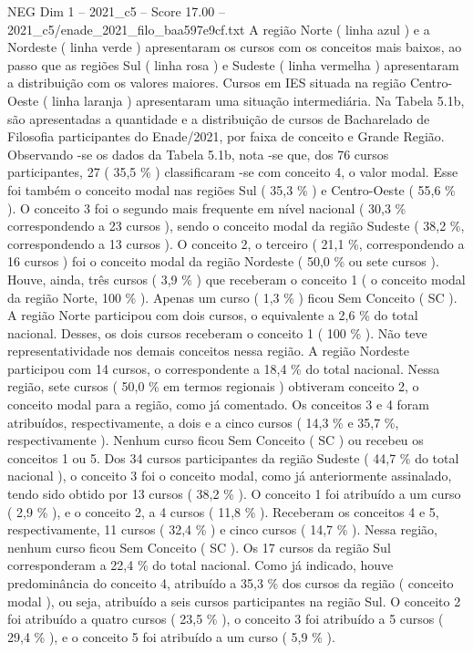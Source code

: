 \begin{textsample}{NEG Dim 1 – 2021\_c5 – Score 17.00 – 2021\_c5/enade\_2021\_filo\_baa597e9cf.txt}
A região Norte ( linha azul ) e a Nordeste ( linha verde ) apresentaram os cursos com os conceitos mais baixos, ao passo que as regiões Sul ( linha rosa ) e Sudeste ( linha vermelha ) apresentaram a distribuição com os valores maiores.
Cursos em IES situada na região Centro-Oeste ( linha laranja ) apresentaram uma situação intermediária.
Na Tabela 5.1b, são apresentadas a quantidade e a distribuição de cursos de Bacharelado de Filosofia participantes do Enade/2021, por faixa de conceito e Grande Região.
Observando -se os dados da Tabela 5.1b, nota -se que, dos 76 cursos participantes, 27 ( 35,5 \% ) classificaram -se com conceito 4, o valor modal.
Esse foi também o conceito modal nas regiões Sul ( 35,3 \% ) e Centro-Oeste ( 55,6 \% ).
O conceito 3 foi o segundo mais frequente em nível nacional ( 30,3 \% correspondendo a 23 cursos ), sendo o conceito modal da região Sudeste ( 38,2 \%, correspondendo a 13 cursos ).
O conceito 2, o terceiro ( 21,1 \%, correspondendo a 16 cursos ) foi o conceito modal da região Nordeste ( 50,0 \% ou sete cursos ).
Houve, ainda, três cursos ( 3,9 \% ) que receberam o conceito 1 ( o conceito modal da região Norte, 100 \% ).
Apenas um curso ( 1,3 \% ) ficou Sem Conceito ( SC ).
A região Norte participou com dois cursos, o equivalente a 2,6 \% do total nacional.
Desses, os dois cursos receberam o conceito 1 ( 100 \% ).
Não teve representatividade nos demais conceitos nessa região.
A região Nordeste participou com 14 cursos, o correspondente a 18,4 \% do total nacional.
Nessa região, sete cursos ( 50,0 \% em termos regionais ) obtiveram conceito 2, o conceito modal para a região, como já comentado.
Os conceitos 3 e 4 foram atribuídos, respectivamente, a dois e a cinco cursos ( 14,3 \% e 35,7 \%, respectivamente ).
Nenhum curso ficou Sem Conceito ( SC ) ou recebeu os conceitos 1 ou 5.
Dos 34 cursos participantes da região Sudeste ( 44,7 \% do total nacional ), o conceito 3 foi o conceito modal, como já anteriormente assinalado, tendo sido obtido por 13 cursos ( 38,2 \% ).
O conceito 1 foi atribuído a um curso ( 2,9 \% ), e o conceito 2, a 4 cursos ( 11,8 \% ).
Receberam os conceitos 4 e 5, respectivamente, 11 cursos ( 32,4 \% ) e cinco cursos ( 14,7 \% ).
Nessa região, nenhum curso ficou Sem Conceito ( SC ).
Os 17 cursos da região Sul corresponderam a 22,4 \% do total nacional.
Como já indicado, houve predominância do conceito 4, atribuído a 35,3 \% dos cursos da região ( conceito modal ), ou seja, atribuído a seis cursos participantes na região Sul.
O conceito 2 foi atribuído a quatro cursos ( 23,5 \% ), o conceito 3 foi atribuído a 5 cursos ( 29,4 \% ), e o conceito 5 foi atribuído a um curso ( 5,9 \% ).

\end{textsample}
